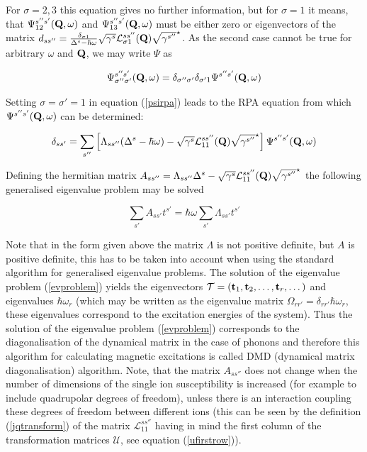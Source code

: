 For $\sigma=2,3$ this equation gives no further information, but for $\sigma=1$ it means, that
$\Psi_{12}^{s''s'}({\mathbf Q},\omega)$ and
$\Psi_{13}^{s''s'}({\mathbf Q},\omega)$  must be either zero or  eigenvectors of the matrix
$d_{ss''}=\frac{\delta_{\sigma1}}{\Delta^s-\hbar\omega}\sqrt{\gamma^s}\mathcal L^{ss''}_{\sigma1}(\mbf Q) %
\sqrt{\gamma^{s''}}^\star$.
As the second case cannot be true for arbitrary $\omega$ and $\mathbf Q$, we may write $\Psi$ as

\begin{equation}
\Psi_{\sigma''\sigma'}^{s''s'}({\mathbf Q},\omega)=\delta_{\sigma''\sigma'} \delta_{\sigma'1}
\Psi^{s''s'}({\mathbf Q},\omega)
\end{equation}

Setting  $\sigma=\sigma'=1$ in equation (\ref{psirpa}) leads to the RPA equation from which 
$\Psi^{s''s'}({\mathbf Q},\omega)$ can be determined:

\begin{equation}\label{psi0rpa}
\delta_{ss'}=\sum_{s''}\left[\Lambda_{ss''}(\Delta^s-\hbar\omega)-\sqrt{\gamma^s} \mathcal L_{11}^{ss''}({\mbf Q}) %
\sqrt{\gamma^{s''}}^\star  \right]
\Psi^{s''s'}({\mbf Q},\omega)
\end{equation}

Defining the hermitian matrix $A_{ss''}=\Lambda_{ss''}\Delta^s-\sqrt{\gamma^s} \mathcal L_{11}^{ss''}({\mbf Q}) %
\sqrt{\gamma^{s''}}^\star$ 
the following generalised eigenvalue problem may be solved

\begin{equation}\label{evproblem}
\sum_{s'} A_{ss'}t^{s'}=\hbar\omega\sum_{s'}\Lambda_{ss'}t^{s'}
\end{equation}

Note that in the form given above the matrix $\Lambda$ is not positive definite, but $A$ is positive definite, this has 
to be taken into account when using the standard algorithm for generalised eigenvalue problems.
The solution of the eigenvalue problem (\ref{evproblem}) yields
the eigenvectors $\mathcal T=\left( \mathbf t_1, \mathbf t_2, \dots,\mathbf t_r,\dots\right)$ and eigenvalues $\hbar \omega_r$
(which may be written as the eigenvalue matrix $\Omega_{rr'}=\delta_{rr'}\hbar \omega_r$, these eigenvalues correspond %
to
the excitation energies of the system). Thus the solution of the eigenvalue problem (\ref{evproblem}) corresponds to the %
diagonalisation of the dynamical matrix in the case of phonons and therefore this algorithm for calculating magnetic %
excitations is called DMD (dynamical matrix diagonalisation) algorithm. Note, that the matrix $A_{ss''}$ does not change
when the number of dimensions of the single ion susceptibility is increased (for example to include quadrupolar degrees %
of freedom), unless there is an interaction coupling these degrees of freedom between different ions (this can be seen %
by the definition (\ref{jqtransform}) of the matrix $\mathcal L_{11}^{ss''}$ having in mind the first column of the %
transformation
matrices $\mathcal U$, see equation (\ref{ufirstrow})).
 

